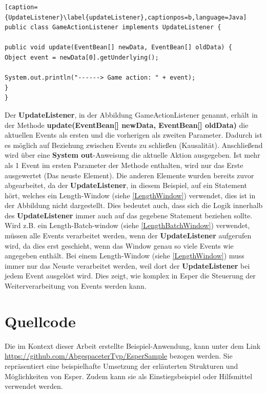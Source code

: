 \begin{lstlisting}[caption={UpdateListener}\label{updateListener},captionpos=b,language=Java]
public class GameActionListener implements UpdateListener {

public void update(EventBean[] newData, EventBean[] oldData) {
Object event = newData[0].getUnderlying();

System.out.println("------> Game action: " + event);
}
}

\end{lstlisting}
Der \textbf{UpdateListener}, in der Abbildung GameActionListener genannt, erhält in der Methode \textbf{update(EventBean[] newData, EventBean[] oldData)} die aktuellen Events als ersten und die vorherigen als zweiten Parameter. Dadurch ist es möglich auf Beziehung zwischen Events zu schließen (Kausalität).
\absatz
Anschließend wird über eine \textbf{System out}-Anweisung die aktuelle Aktion ausgegeben. Ist mehr als 1 Event im ersten Parameter der Methode enthalten, wird nur das Erste ausgewertet (Das neuste Element). Die anderen Elemente wurden bereits zuvor abgearbeitet, da der \textbf{UpdateListener}, in diesem Beispiel, auf ein Statement hört, welches ein Length-Window (siehe \ref{LengthWindow}) verwendet, dies ist in der Abbildung nicht dargestellt.
\absatz
Dies bedeutet auch, dass sich die Logik innerhalb des \textbf{UpdateListener} immer auch auf das gegebene Statement beziehen sollte. Wird z.B. ein Length-Batch-window (siehe \ref{LengthBatchWindow}) verwendet, müssen alle Events verarbeitet werden, wenn der \textbf{UpdateListener} aufgerufen wird, da dies erst geschieht, wenn das Window genau so viele Events wie angegeben enthält. Bei einem Length-Window (siehe \ref{LengthWindow}) muss immer nur das Neuste verarbeitet werden, weil dort der \textbf{UpdateListener} bei jedem Event ausgelöst wird. 
Dies zeigt, wie komplex in Esper die Steuerung der Weiterverarbeitung von Events werden kann. 

\section{Quellcode}

Die im Kontext dieser Arbeit erstellte Beispiel-Anwendung, kann unter dem Link \url{https://github.com/AbgespaceterTyp/EsperSample} bezogen werden.
Sie repräsentiert eine beispielhafte Umsetzung der erläuterten Strukturen und Möglichkeiten von Esper. Zudem kann sie als Einstiegsbeispiel oder Hilfsmittel verwendet werden.
